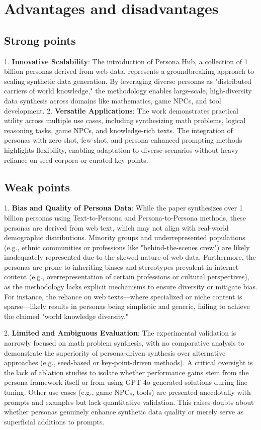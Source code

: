 \section{Advantages and disadvantages}
\subsection{Strong points}
1. \textbf{Innovative Scalability}: The introduction of Persona Hub, a collection of 1 billion personas derived from web data, represents a groundbreaking approach to scaling synthetic data generation. By leveraging diverse personas as "distributed carriers of world knowledge," the methodology enables large-scale, high-diversity data synthesis across domains like mathematics, game NPCs, and tool development.
2. \textbf{Versatile Applications}: The work demonstrates practical utility across multiple use cases, including synthesizing math problems, logical reasoning tasks, game NPCs, and knowledge-rich texts. The integration of personas with zero-shot, few-shot, and persona-enhanced prompting methods highlights flexibility, enabling adaptation to diverse scenarios without heavy reliance on seed corpora or curated key points.

\subsection{Weak points}
1. \textbf{Bias and Quality of Persona Data}: While the paper synthesizes over 1 billion personas using Text-to-Persona and Persona-to-Persona methods, these personas are derived from web text, which may not align with real-world demographic distributions. Minority groups and underrepresented populations (e.g., ethnic communities or professions like "behind-the-scenes crew") are likely inadequately represented due to the skewed nature of web data. Furthermore, the personas are prone to inheriting biases and stereotypes prevalent in internet content (e.g., overrepresentation of certain professions or cultural perspectives), as the methodology lacks explicit mechanisms to ensure diversity or mitigate bias. For instance, the reliance on web texts—where specialized or niche content is sparse—likely results in personas being simplistic and generic, failing to achieve the claimed "world knowledge diversity."

2. \textbf{Limited and Ambiguous Evaluation}: The experimental validation is narrowly focused on math problem synthesis, with no comparative analysis to demonstrate the superiority of persona-driven synthesis over alternative approaches (e.g., seed-based or key-point-driven methods). A critical oversight is the lack of ablation studies to isolate whether performance gains stem from the persona framework itself or from using GPT-4o-generated solutions during fine-tuning. Other use cases (e.g., game NPCs, tools) are presented anecdotally with prompts and examples but lack quantitative validation. This raises doubts about whether personas genuinely enhance synthetic data quality or merely serve as superficial additions to prompts.

